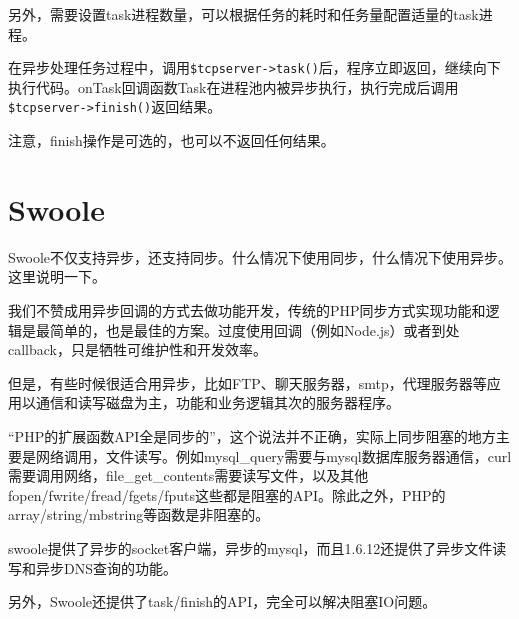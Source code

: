 另外，需要设置task进程数量，可以根据任务的耗时和任务量配置适量的task进程。


在异步处理任务过程中，调用\texttt{\$tcpserver->task()}后，程序立即返回，继续向下执行代码。onTask回调函数Task在进程池内被异步执行，执行完成后调用\texttt{\$tcpserver->finish()}返回结果。

注意，finish操作是可选的，也可以不返回任何结果。


\chapter{Swoole}


Swoole不仅支持异步，还支持同步。什么情况下使用同步，什么情况下使用异步。这里说明一下。


我们不赞成用异步回调的方式去做功能开发，传统的PHP同步方式实现功能和逻辑是最简单的，也是最佳的方案。过度使用回调（例如Node.js）或者到处callback，只是牺牲可维护性和开发效率。

但是，有些时候很适合用异步，比如FTP、聊天服务器，smtp，代理服务器等应用以通信和读写磁盘为主，功能和业务逻辑其次的服务器程序。


“PHP的扩展函数API全是同步的”，这个说法并不正确，实际上同步阻塞的地方主要是网络调用，文件读写。例如mysql\_query需要与mysql数据库服务器通信，curl需要调用网络，file\_get\_contents需要读写文件，以及其他fopen/fwrite/fread/fgets/fputs这些都是阻塞的API。除此之外，PHP的array/string/mbstring等函数是非阻塞的。

swoole提供了异步的socket客户端，异步的mysql，而且1.6.12还提供了异步文件读写和异步DNS查询的功能。

另外，Swoole还提供了task/finish的API，完全可以解决阻塞IO问题。
